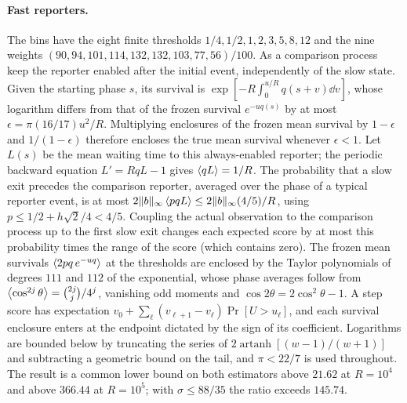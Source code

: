 \paragraph{Fast reporters.} The bins have the eight finite thresholds $1/4,1/2,1,2,3,5,8,12$ and the nine weights $(90,94,101,114,132,132,103,77,56)/100$. As a comparison process keep the reporter enabled after the initial event, independently of the slow state. Given the starting phase $s$, its survival is $\exp[-R\int_0^{u/R}q(s+v)\dd v]$, whose logarithm differs from that of the frozen survival $e^{-uq(s)}$ by at most $\epsilon=\pi(16/17)u^2/R$. Multiplying enclosures of the frozen mean survival by $1-\epsilon$ and $1/(1-\epsilon)$ therefore encloses the true mean survival whenever $\epsilon<1$. Let $L(s)$ be the mean waiting time to this always-enabled reporter; the periodic backward equation $L'=RqL-1$ gives $\left\langle qL\right\rangle=1/R$. The probability that a slow exit precedes the comparison reporter, averaged over the phase of a typical reporter event, is at most $2\|b\|_\infty\left\langle pqL\right\rangle\le 2\|b\|_\infty(4/5)/R$, using $p\le 1/2+h\sqrt2/4<4/5$. Coupling the actual observation to the comparison process up to the first slow exit changes each expected score by at most this probability times the range of the score (which contains zero). The frozen mean survivals $\left\langle 2pq\,e^{-uq}\right\rangle$ at the thresholds are enclosed by the Taylor polynomials of degrees $111$ and $112$ of the exponential, whose phase averages follow from $\left\langle \cos^{2j}\theta\right\rangle=\binom{2j}{j}/4^j$, vanishing odd moments and $\cos2\theta=2\cos^2\theta-1$. A step score has expectation $v_0+\sum_\ell(v_{\ell+1}-v_\ell)\Pr[U>u_\ell]$, and each survival enclosure enters at the endpoint dictated by the sign of its coefficient. Logarithms are bounded below by truncating the series of $2\operatorname{artanh}[(w-1)/(w+1)]$ and subtracting a geometric bound on the tail, and $\pi<22/7$ is used throughout. The result is a common lower bound on both estimators above $21.62$ at $R=10^4$ and above $366.44$ at $R=10^5$; with $\sigma\le88/35$ the ratio exceeds $145.74$.

